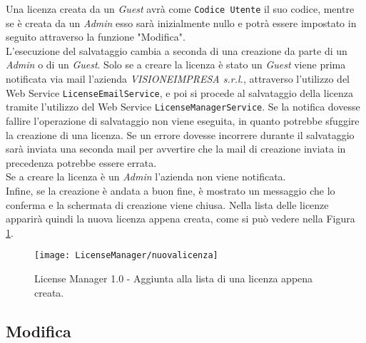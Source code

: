 Una licenza creata da un \textit{Guest} avrà come \texttt{Codice Utente} il suo codice, mentre se è creata da un \textit{Admin} esso sarà inizialmente nullo e potrà essere impostato in seguito attraverso la funzione "Modifica".
\\
L’esecuzione del salvataggio cambia a seconda di una creazione da parte di un \textit{Admin} o di un \textit{Guest}.
Solo se a creare la licenza è stato un \textit{Guest} viene prima notificata via mail l'azienda \textit{VISIONEIMPRESA s.r.l.}, attraverso l'utilizzo del Web Service \texttt{LicenseEmailService}, e poi si procede al salvataggio della licenza tramite l'utilizzo del Web Service \texttt{LicenseManagerService}. Se la notifica dovesse fallire l’operazione di salvataggio non viene eseguita, in quanto potrebbe sfuggire la creazione di una licenza. Se un errore dovesse incorrere durante il salvataggio sarà inviata una seconda mail per avvertire che la mail di creazione inviata in precedenza potrebbe essere errata.\\
Se a creare la licenza è un \textit{Admin} l'azienda non viene notificata.
\\
Infine, se la creazione è andata a buon fine, è mostrato un messaggio che lo conferma e la schermata di creazione viene chiusa. Nella lista delle licenze apparirà quindi la nuova licenza appena creata, come si può vedere nella Figura \ref{nuova}.

\begin{figure}[!h] 
    \centering 
    \texttt{[image: LicenseManager/nuovalicenza]} 
    \caption{License Manager 1.0 - Aggiunta alla lista di una licenza appena creata.}
\label{nuova}
\end{figure}


\subsection{Modifica}

